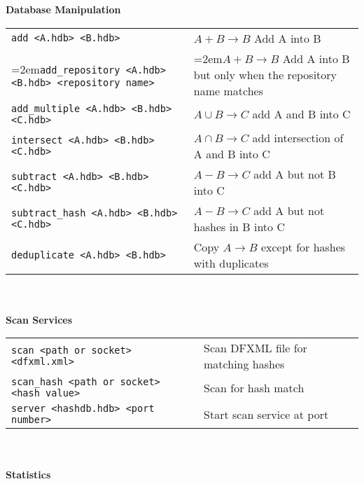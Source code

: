 \documentclass[12pt]{article}
\begin{document}
\textbf{Database Manipulation} \\
\begin{tabular}{p{3.6 in} p{3.4 in}}
\small\texttt{add <A.hdb> <B.hdb>} & $A + B \rightarrow B$ Add A into B \\
\hangindent=2em\small\texttt{add\_repository <A.hdb> <B.hdb> <repository name>} & \hangindent=2em$A + B \rightarrow B$ Add A into B but only when the repository name matches \\
\small\texttt{add\_multiple <A.hdb> <B.hdb> <C.hdb>} & $A \cup B \rightarrow C$ add A and B into C\\
\small\texttt{intersect <A.hdb> <B.hdb> <C.hdb>} & $A \cap B \rightarrow C$ add intersection of A and B into C\\
\small\texttt{subtract <A.hdb> <B.hdb> <C.hdb>} & $A - B \rightarrow C$ add A but not B into C\\
\small\texttt{subtract\_hash <A.hdb> <B.hdb> <C.hdb>} & $A - B \rightarrow C$ add A but not hashes in B into C\\
\small\texttt{deduplicate <A.hdb> <B.hdb>} & Copy $A \rightarrow B$ except for hashes with duplicates \\
\end{tabular}
\\
\\
\textbf{Scan Services} \\
\begin{tabular}{p{3.6 in} p{4 in}}
\small\texttt{scan <path or socket> <dfxml.xml>} & Scan DFXML file for matching hashes \\
\small\texttt{scan\_hash <path or socket> <hash value>} & Scan for hash match \\
\small\texttt{server <hashdb.hdb> <port number>} & Start scan service at port\\
\end{tabular}
\\
\\
\textbf{Statistics}\\
\end{document}
